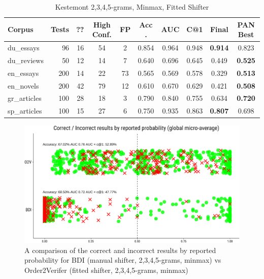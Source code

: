 \documentclass[
    hf,
]{ceurart}
\begin{document}
\begin{table}
    \caption{Kestemont 2,3,4,5-grams, Minmax, Fitted Shifter}
    \label{tab:o2v}
    \raggedright
    \begin{tabular}{lrrccccccc}
        \toprule
        Corpus       & Tests & ?? & High Conf. & FP & Acc  . & AUC   & C@1   & Final          & PAN Best       \\
        \midrule
        du\_essays   & 96    & 16 & 54         & 2  & 0.854  & 0.964 & 0.948 & \textbf{0.914} & 0.823          \\
        du\_reviews  & 50    & 12 & 14         & 7  & 0.640  & 0.696 & 0.645 & 0.449          & \textbf{0.525} \\
        en\_essays   & 200   & 14 & 22         & 73 & 0.565  & 0.569 & 0.578 & 0.329          & \textbf{0.513} \\
        en\_novels   & 200   & 42 & 79         & 12 & 0.610  & 0.670 & 0.629 & 0.421          & \textbf{0.508} \\
        gr\_articles & 100   & 28 & 18         & 3  & 0.790  & 0.840 & 0.755 & 0.634          & \textbf{0.720} \\
        sp\_articles & 100   & 15 & 27         & 6  & 0.750  & 0.935 & 0.863 & \textbf{0.807} & 0.698          \\
        \bottomrule
    \end{tabular}
\end{table}

\begin{figure}
    \includegraphics[width=\linewidth]{figures/bdi_o2v-crop.pdf}
    \caption{A comparison of the correct and incorrect results by reported
        probability for BDI (manual shifter, 2,3,4,5-grams, minmax) vs
        Order2Verifer (fitted shifter, 2,3,4,5-grams, minmax)}
    \label{fig:bdi_o2v}
\end{figure}
\end{document}
